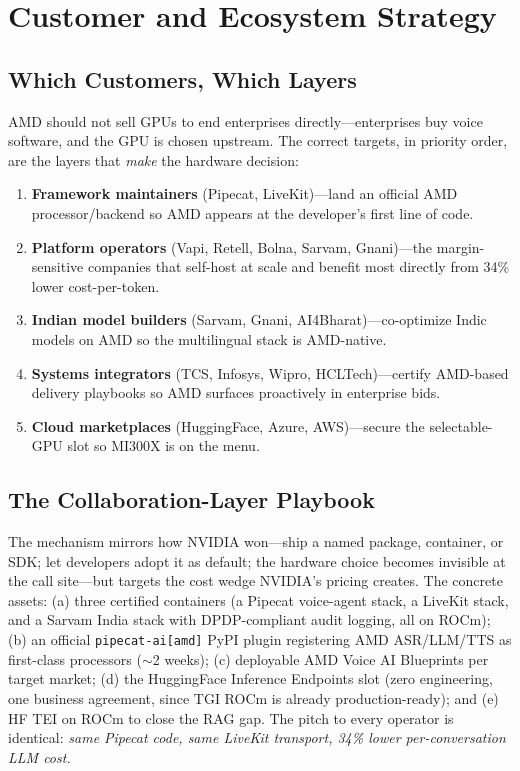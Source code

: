 \documentclass[blind]{gtac}
\begin{document}
\section{Customer and Ecosystem Strategy}
\label{sec:ecosystem}

\subsection{Which Customers, Which Layers}

AMD should not sell GPUs to end enterprises directly---enterprises buy voice software, and the GPU is chosen upstream. The correct targets, in priority order, are the layers that \emph{make} the hardware decision:

\begin{enumerate}
  \item \textbf{Framework maintainers} (Pipecat, LiveKit)---land an official AMD processor/backend so AMD appears at the developer's first line of code.
  \item \textbf{Platform operators} (Vapi, Retell, Bolna, Sarvam, Gnani)---the margin-sensitive companies that self-host at scale and benefit most directly from 34\% lower cost-per-token.
  \item \textbf{Indian model builders} (Sarvam, Gnani, AI4Bharat)---co-optimize Indic models on AMD so the multilingual stack is AMD-native.
  \item \textbf{Systems integrators} (TCS, Infosys, Wipro, HCLTech)---certify AMD-based delivery playbooks so AMD surfaces proactively in enterprise bids.
  \item \textbf{Cloud marketplaces} (HuggingFace, Azure, AWS)---secure the selectable-GPU slot so MI300X is on the menu.
\end{enumerate}

\subsection{The Collaboration-Layer Playbook}

The mechanism mirrors how NVIDIA won---ship a named package, container, or SDK; let developers adopt it as default; the hardware choice becomes invisible at the call site---but targets the cost wedge NVIDIA's pricing creates. The concrete assets: (a) three certified containers (a Pipecat voice-agent stack, a LiveKit stack, and a Sarvam India stack with DPDP-compliant audit logging, all on ROCm); (b) an official \texttt{pipecat-ai[amd]} PyPI plugin registering AMD ASR/LLM/TTS as first-class processors ($\sim$2 weeks); (c) deployable AMD Voice AI Blueprints per target market; (d) the HuggingFace Inference Endpoints slot (zero engineering, one business agreement, since TGI ROCm is already production-ready); and (e) HF TEI on ROCm to close the RAG gap. The pitch to every operator is identical: \emph{same Pipecat code, same LiveKit transport, 34\% lower per-conversation LLM cost.}
\end{document}

